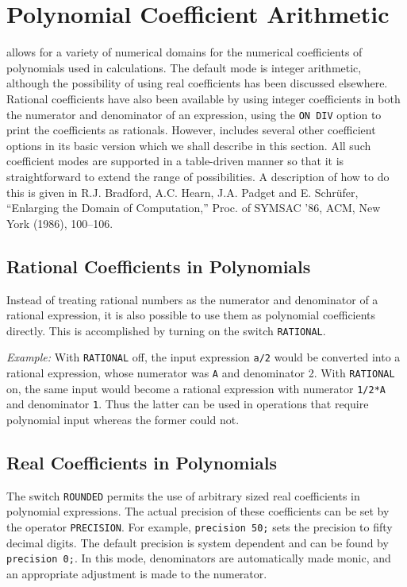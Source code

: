 \section{Polynomial Coefficient Arithmetic}
{\REDUCE} allows for a variety of numerical domains for the numerical
coefficients of polynomials used in calculations.  The default mode is
integer arithmetic, although the possibility of using real coefficients
 has been discussed elsewhere.  Rational
coefficients have also been available by using integer coefficients in
both the numerator and denominator of an expression, using the {\tt ON
DIV} option to print the coefficients as rationals.
However, {\REDUCE} includes several other coefficient options in its basic
version which we shall describe in this section.  All such coefficient
modes are supported in a table-driven manner so that it is
straightforward to extend the range of possibilities.  A description of
how to do this is given in R.J. Bradford, A.C. Hearn, J.A. Padget and
E. Schr\"ufer, ``Enlarging the {\REDUCE} Domain of Computation,'' Proc. of
SYMSAC '86, ACM, New York (1986), 100--106.

\subsection{Rational Coefficients in Polynomials}
Instead of treating rational numbers as the numerator and denominator of a
rational expression, it is also possible to use them as polynomial
coefficients directly. This is accomplished by turning on the switch
{\tt RATIONAL}.

{\it Example:} With {\tt RATIONAL} off, the input expression {\tt a/2}
would be converted into a rational expression, whose numerator was {\tt A}
and denominator 2.  With {\tt RATIONAL} on, the same input would become a
rational expression with numerator {\tt 1/2*A} and denominator {\tt 1}.
Thus the latter can be used in operations that require polynomial input
whereas the former could not.

\subsection{Real Coefficients in Polynomials}
The switch {\tt ROUNDED} permits the use of arbitrary
sized real coefficients in polynomial expressions.  The actual precision
of these coefficients can be set by the operator {\tt PRECISION}.
 For example, {\tt precision 50;} sets the precision to
fifty decimal digits.  The default precision is system dependent and can
be found by {\tt precision 0;}.  In this mode, denominators are
automatically made monic, and an appropriate adjustment is made to the
numerator.

